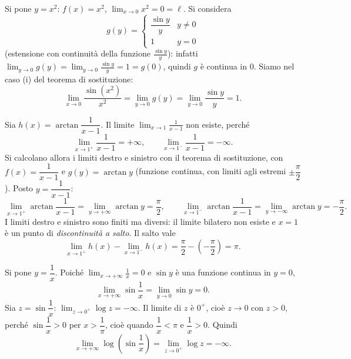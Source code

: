 \documentclass[11pt,a4paper]{article}
\begin{document}
\begin{esempio}
Si pone $y = x^2$: $f(x) = x^2$, $\displaystyle\lim_{x\to 0} x^2 = 0 = \ell$. Si considera
\[
  g(y) = \begin{cases} \dfrac{\sin y}{y} & y \neq 0 \\[2mm] 1 & y = 0 \end{cases}
\]
(estensione con continuità della funzione $\frac{\sin y}{y}$): infatti $\displaystyle\lim_{y\to 0} g(y) = \lim_{y\to 0}\frac{\sin y}{y} = 1 = g(0)$, quindi $g$ è continua in $0$. Siamo nel caso (i) del teorema di sostituzione:
\[
  \lim_{x\to 0}\frac{\sin(x^2)}{x^2} = \lim_{y\to 0} g(y) = \lim_{y\to 0}\frac{\sin y}{y} = 1.
\]
\end{esempio}

\begin{esempio}
Sia $h(x) = \arctan\dfrac{1}{x - 1}$. Il limite $\displaystyle\lim_{x\to 1}\frac{1}{x-1}$ non esiste, perché
\[
  \lim_{x\to 1^+}\frac{1}{x-1} = +\infty, \qquad \lim_{x\to 1^-}\frac{1}{x-1} = -\infty .
\]
Si calcolano allora i limiti destro e sinistro con il teorema di sostituzione, con $f(x) = \dfrac{1}{x-1}$ e $g(y) = \arctan y$ (funzione continua, con limiti agli estremi $\pm\dfrac{\pi}{2}$). Posto $y = \dfrac{1}{x-1}$:
\[
  \lim_{x\to 1^+}\arctan\frac{1}{x - 1} = \lim_{y\to+\infty}\arctan y = \frac{\pi}{2}, \qquad
  \lim_{x\to 1^-}\arctan\frac{1}{x - 1} = \lim_{y\to-\infty}\arctan y = -\frac{\pi}{2}.
\]
I limiti destro e sinistro sono finiti ma diversi: il limite bilatero non esiste e $x = 1$ è un punto di \emph{discontinuità a salto}. Il salto vale
\[
  \lim_{x\to 1^+}h(x) - \lim_{x\to 1^-}h(x) = \frac{\pi}{2} - \left(-\frac{\pi}{2}\right) = \pi .
\]
\end{esempio}

\begin{esempio}
Si pone $y = \dfrac{1}{x}$. Poiché $\displaystyle\lim_{x\to+\infty}\frac{1}{x} = 0$ e $\sin y$ è una funzione continua in $y = 0$,
\[
  \lim_{x\to+\infty}\sin\frac{1}{x} = \lim_{y\to 0}\sin y = 0 .
\]
Sia $z = \sin\dfrac{1}{x}$: $\displaystyle\lim_{z\to 0^+}\log z = -\infty$. Il limite di $z$ è $0^+$, cioè $z \to 0$ con $z > 0$, perché $\sin\dfrac{1}{x} > 0$ per $x > \dfrac{1}{\pi}$, cioè quando $\dfrac{1}{x} < \pi$ e $\dfrac{1}{x} > 0$. Quindi
\[
  \lim_{x\to+\infty}\log\left(\sin\frac{1}{x}\right) = \lim_{z\to 0^+}\log z = -\infty .
\]
\end{esempio}
\end{document}
